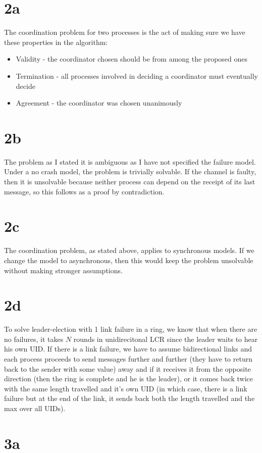 \documentclass[a4paper,10pt,]{report}
\begin{document}
\section{2a}
The coordination problem for two processes is the act of making sure we have these properties in the algorithm:
\begin{itemize}
\item Validity - the coordinator chosen should be from among the proposed ones
\item Termination - all processes involved in deciding a coordinator must eventually decide
\item Agreement - the coordinator was chosen unanimously
\end{itemize}
\section{2b}
The problem as I stated it is ambiguous as I have not specified the failure model.  Under a no crash model, the problem is trivially solvable.  If the channel is faulty, then it is unsolvable because neither process can depend on the receipt of its last message, so this follows as a proof by contradiction.
\section{2c}
The coordination problem, as stated above, applies to synchronous models.  If we change the model to asynchronous, then this would keep the problem unsolvable without making stronger assumptions.
\section{2d}
To solve leader-election with 1 link failure in a ring, we know that when there are no failures, it takes $N$ rounds in unidirecitonal LCR since the leader waits to hear his own UID.  If there is a link failure, we have to assume bidirectional links and each process proceeds to send messages further and further (they have to return back to the sender with some value) away and if it receives it from the opposite direction (then the ring is complete and he is the leader), or it comes back twice with the same length travelled and it's own UID (in which case, there is a link failure but at the end of the link, it sends back both the length travelled and the max over all UIDs).

\section{3a}
\end{document}
